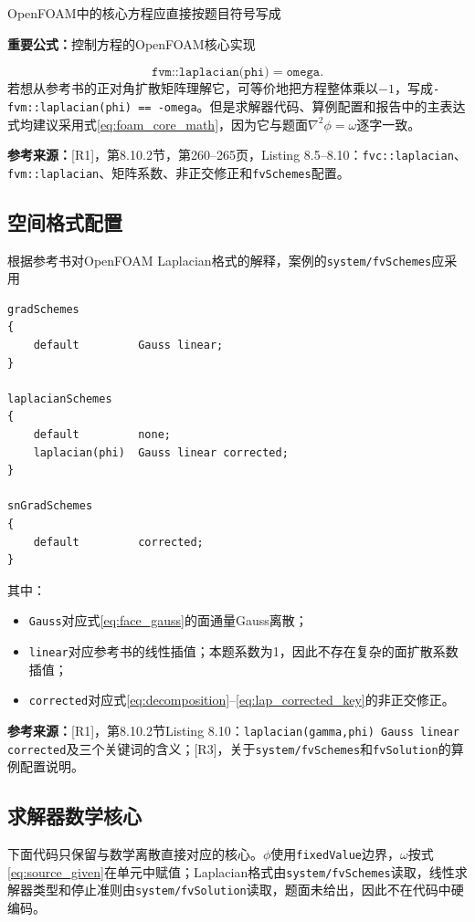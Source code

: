 \documentclass[UTF8,12pt,a4paper]{ctexart}
\numberwithin{equation}{section}
\newcommand{\Rone}{\textnormal{[R1]}}
\newcommand{\Rthree}{\textnormal{[R3]}}
\newcommand{\source}[1]{%
  \par\smallskip
  \noindent\colorbox{sourcebg}{%
    \parbox{0.955\linewidth}{\footnotesize\color{sourcegray}\textbf{参考来源：}#1}%
  }
  \par\smallskip
}
\newcommand{\keytitle}[1]{%
  \par\smallskip\noindent
  \colorbox{keybg}{\parbox{0.965\linewidth}{\color{keyblue}\textbf{重要公式：}#1}}
  \par\smallskip
}
\begin{document}
OpenFOAM中的核心方程应直接按题目符号写成
\keytitle{控制方程的OpenFOAM核心实现}
\begin{equation}
  \boxed{
  \texttt{fvm::laplacian(phi)}
  =\texttt{omega}.}
  \label{eq:foam_core_math}
\end{equation}
若想从参考书的正对角扩散矩阵理解它，可等价地把方程整体乘以$-1$，写成\texttt{-fvm::laplacian(phi) == -omega}。但是求解器代码、算例配置和报告中的主表达式均建议采用式\eqref{eq:foam_core_math}，因为它与题面$\nabla^2\phi=\omega$逐字一致。

\source{\Rone，第8.10.2节，第260--265页，Listing 8.5--8.10：\texttt{fvc::laplacian}、\texttt{fvm::laplacian}、矩阵系数、非正交修正和\texttt{fvSchemes}配置。}

\subsection{空间格式配置}

根据参考书对OpenFOAM Laplacian格式的解释，案例的\texttt{system/fvSchemes}应采用
\begin{lstlisting}[style=foam]
gradSchemes
{
    default         Gauss linear;
}

laplacianSchemes
{
    default         none;
    laplacian(phi)  Gauss linear corrected;
}

snGradSchemes
{
    default         corrected;
}
\end{lstlisting}
其中：
\begin{itemize}
  \item \texttt{Gauss}对应式\eqref{eq:face_gauss}的面通量Gauss离散；
  \item \texttt{linear}对应参考书的线性插值；本题系数为1，因此不存在复杂的面扩散系数插值；
  \item \texttt{corrected}对应式\eqref{eq:decomposition}--\eqref{eq:lap_corrected_key}的非正交修正。
\end{itemize}

\source{\Rone，第8.10.2节Listing 8.10：\texttt{laplacian(gamma,phi) Gauss linear corrected}及三个关键词的含义；\Rthree，关于\texttt{system/fvSchemes}和\texttt{fvSolution}的算例配置说明。}

\subsection{求解器数学核心}

下面代码只保留与数学离散直接对应的核心。$\phi$使用\texttt{fixedValue}边界，$\omega$按式\eqref{eq:source_given}在单元中赋值；Laplacian格式由\texttt{system/fvSchemes}读取，线性求解器类型和停止准则由\texttt{system/fvSolution}读取，题面未给出，因此不在代码中硬编码。
\end{document}
